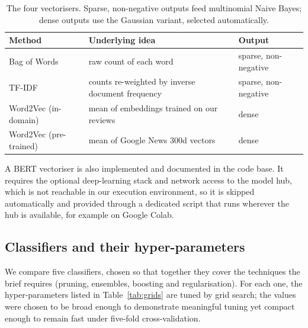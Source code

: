 \documentclass[11pt,a4paper]{article}
\begin{document}
\begin{table}[H]
\centering
\begin{tabular}{lll}
\toprule
\textbf{Method} & \textbf{Underlying idea} & \textbf{Output} \\
\midrule
Bag of Words & raw count of each word & sparse, non-negative \\
TF-IDF & counts re-weighted by inverse document frequency & sparse, non-negative \\
Word2Vec (in-domain) & mean of embeddings trained on our reviews & dense \\
Word2Vec (pre-trained) & mean of Google News $300$d vectors & dense \\
\bottomrule
\end{tabular}
\caption{The four vectorisers. Sparse, non-negative outputs feed multinomial Naive
Bayes; dense outputs use the Gaussian variant, selected automatically.}
\label{tab:vec}
\end{table}

A BERT vectoriser is also implemented and documented in the code base. It requires the
optional deep-learning stack and network access to the model hub, which is not reachable
in our execution environment, so it is skipped automatically and provided through a
dedicated script that runs wherever the hub is available, for example on Google Colab.

\subsection{Classifiers and their hyper-parameters}
\label{sec:clf}
We compare five classifiers, chosen so that together they cover the techniques the
brief requires (pruning, ensembles, boosting and regularisation). For each one, the
hyper-parameters listed in Table~\ref{tab:grids} are tuned by grid search; the values
were chosen to be broad enough to demonstrate meaningful tuning yet compact enough to
remain fast under five-fold cross-validation.
\end{document}
